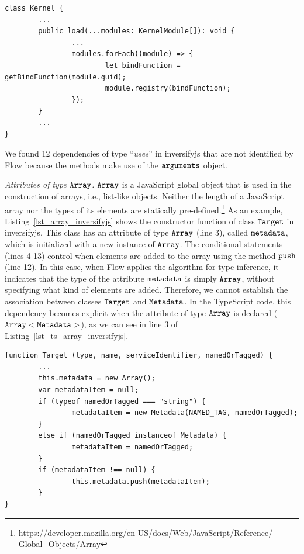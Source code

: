 \documentclass[review]{elsarticle}
\newcommand{\aspas}[1]{{``#1''}}
\newcommand{\mcode}[1]{$\tt #1$}
\begin{document}
\vspace{0.1cm}

\begin{lstlisting}[caption=TypeScript version of method \mcode{load} from class \mcode{Kernel}, label=lst_ts_load_inversifyjs, emph={[2]KernelModule},emphstyle={[2]\ttfamily\bfseries\color{darkgreen}}]
class Kernel {
		...
		public load(...modules: KernelModule[]): void {
				...
				modules.forEach((module) => {
						let bindFunction = getBindFunction(module.guid);
						module.registry(bindFunction);
				});
		}	
		...
}

\end{lstlisting} 

We found 12 dependencies of type \aspas{\textit{uses}} in {\sc inversifyjs} that are not identified by Flow because the methods make use of the \mcode{arguments} object. 

\vspace{0.3cm}

\noindent \textit{Attributes of type \mcode{Array}.} \mcode{Array} is a JavaScript global object that is used in the construction of arrays, i.e., list-like objects. Neither the length of a JavaScript array nor the types of its elements are statically pre-defined.\footnote{https://developer.mozilla.org/en-US/docs/Web/JavaScript/Reference/ Global\_Objects/Array} As an example, Listing~\ref{lst_array_inversifyjs} shows the constructor function of class \mcode{Target} in {\sc inversifyjs}. This class has an attribute of type \mcode{Array} (line 3), called \mcode{metadata}, which is initialized with a new instance of \mcode{Array}. The conditional statements (lines 4-13) control when elements are added to the array using the method \mcode{push} (line 12). In this case, when Flow applies the algorithm for type inference, it indicates that the type of the attribute \mcode{metadata} is simply \mcode{Array}, without specifying what kind of elements are added. Therefore, we cannot establish the association between classes \mcode{Target} and \mcode{Metadata}. In the TypeScript code, this dependency becomes explicit when the attribute of type \mcode{Array} is declared (\mcode{Array<Metadata>}), as we can see in line 3 of Listing~\ref{lst_ts_array_inversifyjs}. 

\vspace{0.2cm}

\begin{lstlisting}[caption=Example of class constructor that has an attribute of type \mcode{Array},  label=lst_array_inversifyjs, emph={[2]module},emphstyle={[2]\ttfamily\bfseries\color{darkgreen}}]
function Target (type, name, serviceIdentifier, namedOrTagged) {
		...
		this.metadata = new Array();
		var metadataItem = null;
		if (typeof namedOrTagged === "string") {
				metadataItem = new Metadata(NAMED_TAG, namedOrTagged);
		}
		else if (namedOrTagged instanceof Metadata) {
				metadataItem = namedOrTagged;
		}
		if (metadataItem !== null) {
				this.metadata.push(metadataItem);
		}
}
\end{lstlisting} 
\end{document}
